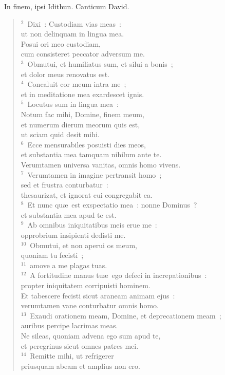 ~\lettrine[lines=10,image=true,loversize=0.05,lraise=-0.03]{I}{}n finem, ipsi Idithun. Canticum David.
\begin{flushleft}\begin{verse}\vspace{6pt}${}^{2}$~Dixi~: Custodiam vias meas~:\\ ut non delinquam in lingua mea.\\ Posui ori meo custodiam,\\ cum consisteret peccator adversum me.\\
${}^{3}$~Obmutui, et humiliatus sum, et silui a bonis~;\\ et dolor meus renovatus est.\\
${}^{4}$~Concaluit cor meum intra me~;\\ et in meditatione mea exardescet ignis.\\
${}^{5}$~Locutus sum in lingua mea~:\\ Notum fac mihi, Domine, finem meum,\\ et numerum dierum meorum quis est,\\ ut sciam quid desit mihi.\\
${}^{6}$~Ecce mensurabiles posuisti dies meos,\\ et substantia mea tamquam nihilum ante te.\\ Verumtamen universa vanitas, omnis homo vivens.\\
${}^{7}$~Verumtamen in imagine pertransit homo~;\\ sed et frustra conturbatur~:\\ thesaurizat, et ignorat cui congregabit ea.\\
${}^{8}$~Et nunc qu\ae\ est exspectatio mea~: nonne Dominus~?\\ et substantia mea apud te est.\\
${}^{9}$~Ab omnibus iniquitatibus meis erue me~:\\ opprobrium insipienti dedisti me.\\
${}^{10}$~Obmutui, et non aperui os meum,\\ quoniam tu fecisti~;\\
${}^{11}$~amove a me plagas tuas.\\
${}^{12}$~A fortitudine manus tu\ae\ ego defeci in increpationibus~:\\ propter iniquitatem corripuisti hominem.\\ Et tabescere fecisti sicut araneam animam ejus~:\\ verumtamen vane conturbatur omnis homo.\\
${}^{13}$~Exaudi orationem meam, Domine, et deprecationem meam~;\\ auribus percipe lacrimas meas.\\ Ne sileas, quoniam advena ego sum apud te,\\ et peregrinus sicut omnes patres mei.\\
${}^{14}$~Remitte mihi, ut refrigerer\\ priusquam abeam et amplius non ero.\end{verse}\end{flushleft}


